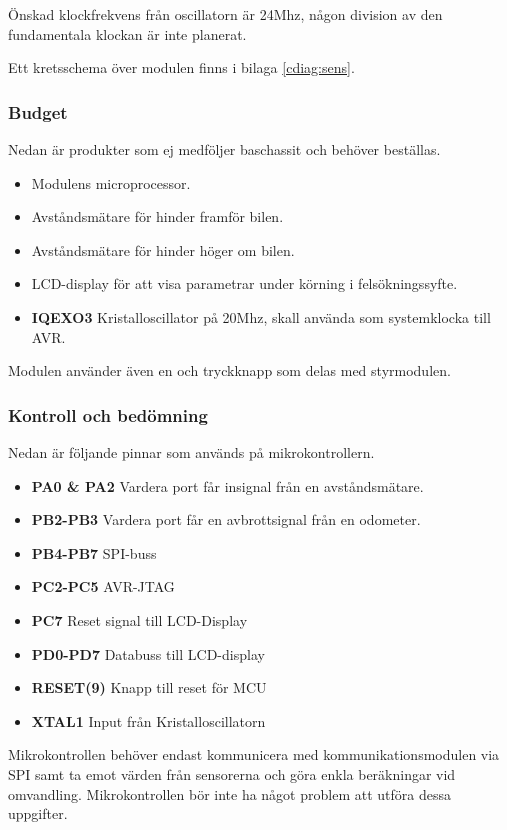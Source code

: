 \documentclass[designspec/spec.tex]{subfiles}
\begin{document}
Önskad klockfrekvens från oscillatorn är 24Mhz, någon division av den
fundamentala klockan är inte planerat.

Ett kretsschema över modulen finns i bilaga \ref{cdiag:sens}.

\subsubsection{Budget}
Nedan är produkter som ej medföljer baschassit och behöver beställas.
\begin{itemize}
	\item \textbf{\modMicrocontroller} Modulens microprocessor. 
    \item \textbf{\modDistf} Avståndsmätare för hinder framför bilen.
    \item \textbf{\modDists} Avståndsmätare för hinder höger om bilen.
    \item \textbf{\modLcd} LCD-display för att visa parametrar under körning
    i felsökningssyfte.
    \item \textbf{IQEXO3} Kristalloscillator på 20Mhz, skall använda som systemklocka till AVR.
\end{itemize}
Modulen använder även en {\modJtag} och tryckknapp som delas med styrmodulen.

\subsubsection{Kontroll och bedömning}
Nedan är följande pinnar som används på mikrokontrollern.
\begin{itemize}
   \item \textbf{PA0 \& PA2} Vardera port får insignal från en avståndsmätare.
   \item \textbf{PB2-PB3} Vardera port får en avbrottsignal från en odometer.
   \item \textbf{PB4-PB7} SPI-buss
   \item \textbf{PC2-PC5} AVR-JTAG
   \item \textbf{PC7} Reset signal till LCD-Display
   \item \textbf{PD0-PD7} Databuss till LCD-display
   \item \textbf{RESET(9)} Knapp till reset för MCU
   \item \textbf{XTAL1} Input från Kristalloscillatorn
\end{itemize}
Mikrokontrollen behöver endast kommunicera med kommunikationsmodulen via SPI
samt ta emot värden från sensorerna och göra enkla beräkningar vid omvandling.
Mikrokontrollen bör inte ha något problem att utföra dessa uppgifter.
\end{document}
